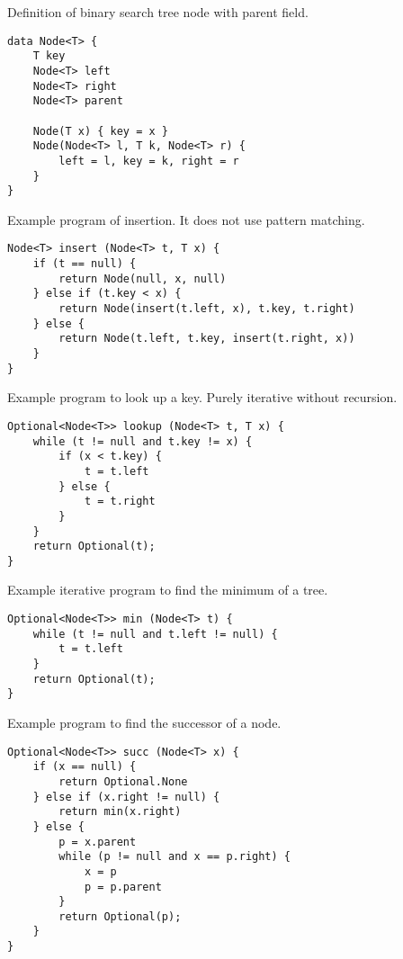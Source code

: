 \documentclass[b5paper]{article}
\begin{document}
Definition of binary search tree node with parent field.

\lstset{language=Bourbaki, frame=single}
\begin{lstlisting}
data Node<T> {
    T key
    Node<T> left
    Node<T> right
    Node<T> parent

    Node(T x) { key = x }
    Node(Node<T> l, T k, Node<T> r) {
        left = l, key = k, right = r
    }
}
\end{lstlisting}

Example program of insertion. It does not use pattern matching.

\begin{lstlisting}
Node<T> insert (Node<T> t, T x) {
    if (t == null) {
        return Node(null, x, null)
    } else if (t.key < x) {
        return Node(insert(t.left, x), t.key, t.right)
    } else {
        return Node(t.left, t.key, insert(t.right, x))
    }
}
\end{lstlisting}

Example program to look up a key. Purely iterative without recursion.

\begin{lstlisting}
Optional<Node<T>> lookup (Node<T> t, T x) {
    while (t != null and t.key != x) {
        if (x < t.key) {
            t = t.left
        } else {
            t = t.right
        }
    }
    return Optional(t);
}
\end{lstlisting}

Example iterative program to find the minimum of a tree.

\begin{lstlisting}
Optional<Node<T>> min (Node<T> t) {
    while (t != null and t.left != null) {
        t = t.left
    }
    return Optional(t);
}
\end{lstlisting}

Example program to find the successor of a node.
\begin{lstlisting}
Optional<Node<T>> succ (Node<T> x) {
    if (x == null) {
        return Optional.None
    } else if (x.right != null) {
        return min(x.right)
    } else {
        p = x.parent
        while (p != null and x == p.right) {
            x = p
            p = p.parent
        }
        return Optional(p);
    }
}
\end{lstlisting}

\end{document}
